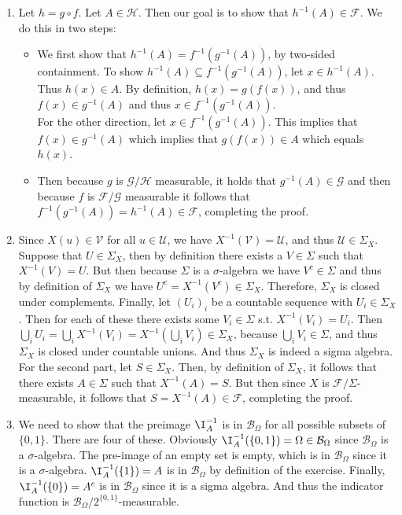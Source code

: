 \begin{gradedsolution}
    \begin{enumerate}
        \item Let $h = g \circ f$. Let $A \in \mathcal{H}$. Then our goal is to show that $h^{-1}(A) \in \mathcal{F}$. We do this in two steps:
        \begin{itemize}
            \item We first show that $h^{-1}(A) = f^{-1}(g^{-1}(A))$, by two-sided containment. To show $h^{-1}(A) \subseteq f^{-1}(g^{-1}(A))$, let $x \in h^{-1}(A)$. Thus $h(x) \in A$. By definition, $h(x) = g(f(x))$, and thus $f(x) \in g^{-1}(A)$ and thus $x \in f^{-1}(g^{-1}(A))$.\\
            For the other direction, let $x \in f^{-1}(g^{-1}(A))$. This implies that $f(x) \in g^{-1}(A)$ which implies that $g(f(x)) \in A$ which equals $h(x)$. 
            \item Then because $g$ is $\mathcal{G}/\mathcal{H}$ measurable, it holds that $g^{-1}(A) \in \mathcal{G}$ and then because $f$ is $\mathcal{F}/\mathcal{G}$ measurable it follows that $f^{-1}(g^{-1}(A)) = h^{-1}(A) \in \mathcal{F}$, completing the proof.
        \end{itemize}
        \item Since $X(u) \in \mathcal{V}$ for all $u \in \mathcal{U}$, we have $X^{-1}(\mathcal{V}) = \mathcal{U}$, and thus $\mathcal{U} \in \Sigma_X$. Suppose that $U \in \Sigma_X$, then by definition there exists a $V \in \Sigma$ such that $X^{-1}(V) = U$. But then because $\Sigma$ is a $\sigma$-algebra we have $V^c \in \Sigma$ and thus by definition of $\Sigma_X$ we have $U^c = X^{-1}(V^c) \in \Sigma_X$. Therefore, $\Sigma_X$ is closed under complements. Finally, let $(U_i)_i$ be a countable sequence with $U_i \in \Sigma_X$. Then for each of these there exists some $V_i \in \Sigma$ s.t. $X^{-1}(V_i) = U_i$. Then $\bigcup_i U_i = \bigcup_i X^{-1}(V_i) = X^{-1}(\bigcup_i V_i) \in \Sigma_X$, because $\bigcup_i V_i \in \Sigma$, and thus $\Sigma_X$ is closed under countable unions. And thus $\Sigma_X$ is indeed a sigma algebra.\\
        For the second part, let $S \in \Sigma_X$. Then, by definition of $\Sigma_X$, it follows that there exists $A \in \Sigma$ such that $X^{-1}(A) = S$. But then since $X$ is $\mathcal{F}/\Sigma$-measurable, it follows that $S = X^{-1}(A) \in \mathcal{F}$, completing the proof.
        \item We need to show that the preimage $\I_A^{-1}$ is in $\mathcal{B}_{\Omega}$ for all possible subsets of $\{0, 1\}$. There are four of these. Obviously $\I_A^{-1}(\{0,1\}) = \Omega \in \mathcal{B}_{\Omega}$ since $\mathcal{B}_{\Omega}$ is a $\sigma$-algebra. The pre-image of an empty set is empty, which is in $\mathcal{B}_{\Omega}$ since it is a $\sigma$-algebra. $\I_A^{-1}(\{1\}) = A$ is in $\mathcal{B}_{\Omega}$ by definition of the exercise. Finally, $\I_A^{-1}(\{0\}) = A^c$ is in $\mathcal{B}_{\Omega}$ since it is a sigma algebra. And thus the indicator function is $\mathcal{B}_{\Omega} / 2^{\{0,1\}}$-measurable.

\end{enumerate}
\end{gradedsolution}
